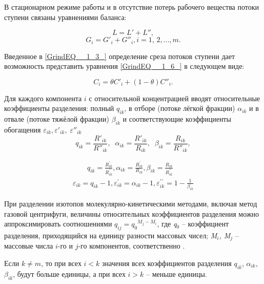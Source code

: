 В стационарном режиме работы и в отсутствие потерь рабочего вещества потоки ступени связаны уравнениями баланса:

\begin{equation} \label{GrindEQ__1_5_} 
  L=L'+L'', 
  \end{equation} 
  \begin{equation} \label{GrindEQ__1_6_} 
  G_{i} =G'_{i} +G''_{i} , i=1,\, 2,...,m.             
\end{equation} 
  

Введенное в \ref{GrindEQ__1_3_} определение среза потоков ступени дает возможность представить уравнения \ref{GrindEQ__1_6_} в следующем виде:

\begin{equation} \label{GrindEQ__1_7_} 
  C_{i} =\theta C'_{i} +(1-\theta )C''_{i} . 
\end{equation} 

Для каждого компонента $i$ с относительной концентрацией вводят относительные коэффициенты разделения: полный $q_{ik}$, в отборе (потоке лёгкой фракции) $\alpha _{ik} $ и в отвале (потоке тяжёлой фракции) $\beta _{ik} $ и соответствующие коэффициенты обогащения $\varepsilon _{ik} ,\varepsilon '_{ik} ,\; \varepsilon ''_{ik} \; $
\[q_{ik} =\frac{R'_{ik} }{R''_{ik} } ,\; \; \alpha _{ik} =\frac{R'_{ik} }{R_{ik} } ,\; \; \beta _{ik} =\frac{R_{ik} }{R''_{ik} } ,\] 

\begin{equation} \label{GrindEQ__1_11_} 
  \begin{array}{l}
    \qquad q_{i k}=\frac{R_{i k}^{\prime}}{R_{i k}^{\prime \prime}}, \alpha_{i k}=\frac{R_{i k}^{\prime}}{R_{i k}}, \beta_{i k}=\frac{R_{i k}}{R_{i k}^{\prime \prime}} \\
    \varepsilon_{i k}=q_{i k}-1, \varepsilon_{i k}^{\prime}=\alpha_{i k}-1, \varepsilon_{i k}^{\prime \prime}=1-\frac{1}{\beta_{i k}}
    \end{array}
\end{equation} 

При разделении изотопов молекулярно-кинетическими методами, включая метод газовой центрифуги, величины относительных коэффициентов разделения можно аппроксимировать соотношениями $q_{ij} =q_{0} {}^{M_{j} -M_{i} }$, где \textit{q}${}_{0}$ -- коэффициент разделения, приходящийся на единицу разности массовых чисел; \textit{M${}_{i}$, M${}_{j}$} – массовые числа $i$-го и $j$-го компонентов, соответственно \cite{sulaberidzeTeoriyaKaskadovDlya2011}.

Если $k\ne m$, то при всех $i<k$ значения всех коэффициентов разделения $q_{ik} $, $\alpha _{ik} $, $\beta _{ik} $, будут больше единицы, а при всех $i>k$ -- меньше единицы.


